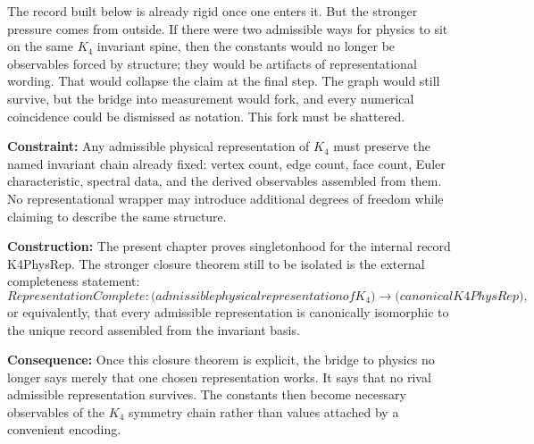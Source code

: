 \documentclass[11pt,a4paper]{book}
\def\mathrm#1{#1}%
\def\texttt#1{#1}%
\def\text#1{#1}%
\begin{document}
The record built below is already rigid once one enters it. But the stronger pressure comes from outside. If there were two admissible ways for physics to sit on the same $K_4$ invariant spine, then the constants would no longer be observables forced by structure; they would be artifacts of representational wording. That would collapse the claim at the final step. The graph would still survive, but the bridge into measurement would fork, and every numerical coincidence could be dismissed as notation. This fork must be shattered.

\textbf{Constraint:} Any admissible physical representation of $K_4$ must preserve the named invariant chain already fixed: vertex count, edge count, face count, Euler characteristic, spectral data, and the derived observables assembled from them. No representational wrapper may introduce additional degrees of freedom while claiming to describe the same structure.

\textbf{Construction:} The present chapter proves singletonhood for the internal record \texttt{K4PhysRep}. The stronger closure theorem still to be isolated is the external completeness statement:
$$
\mathrm{RepresentationComplete} :
\bigl(\text{admissible physical representation of }K_4\bigr)
\to
\bigl(\text{canonical }K4PhysRep\bigr),
$$
or equivalently, that every admissible representation is canonically isomorphic to the unique record assembled from the invariant basis.

\textbf{Consequence:} Once this closure theorem is explicit, the bridge to physics no longer says merely that one chosen representation works. It says that no rival admissible representation survives. The constants then become necessary observables of the $K_4$ symmetry chain rather than values attached by a convenient encoding.
\end{document}
